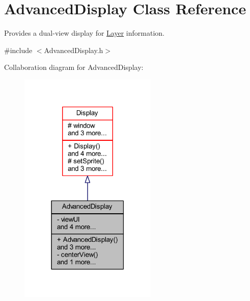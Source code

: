 \hypertarget{class_advanced_display}{}\section{Advanced\+Display Class Reference}
\label{class_advanced_display}


Provides a dual-\/view display for \hyperlink{class_layer}{Layer} information.  




{\ttfamily \#include $<$Advanced\+Display.\+h$>$}



Collaboration diagram for Advanced\+Display\+:\nopagebreak
\begin{figure}[H]
\begin{center}
\leavevmode
\includegraphics[width=186pt]{class_advanced_display__coll__graph}
\end{center}
\end{figure}
